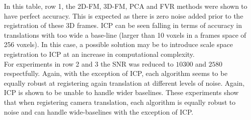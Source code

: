 In this table, row 1, the 2D-FM, 3D-FM, PCA and FVR methods were shown to have perfect accuracy. This is expected as there is zero noise added prior to the registration of these 3D frames. ICP can be seen falling in terms of accuracy in translations with too wide a base-line (larger than 10 voxels in a frames space of 256 voxels). In this case, a possible solution may be to introduce scale space registration to ICP at an increase in computational complexity. \\  

For experiments in row 2 and 3 the SNR was reduced to $10300$ and $2580$ respectfully. Again, with the exception of ICP, each algorithm seems to be equally robust at registering again translation at different levels of noise. Again, ICP is shown to be unable to handle wider baselines. These experiments show that when registering camera translation, each algorithm is equally robust to noise and can handle wide-baselines with the exception of ICP. \\
